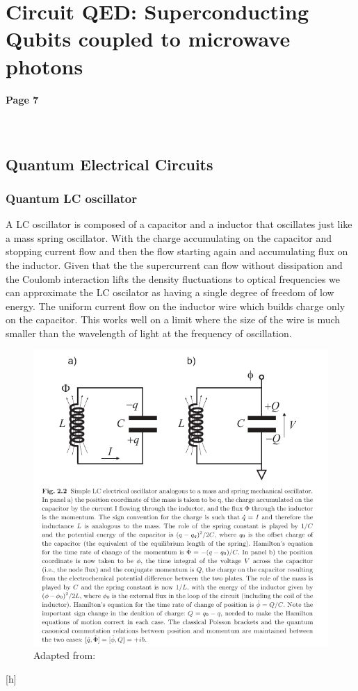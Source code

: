 \documentclass[12pt]{article}
\numberwithin{equation}{subsection}
\newcommand\page[1]{
{
\color{blue}\paragraph{
Page #1
}\mbox{}\\
}
}
\begin{document}
\section{Circuit QED: Superconducting Qubits coupled to microwave photons\cite{Girvin2015CircuitQS}}
\page{7}
\subsection{Quantum Electrical Circuits}
\subsubsection{Quantum LC oscillator}
A LC oscillator is composed of a capacitor and a inductor that oscillates just like a mass spring oscillator. With the charge accumulating on the capacitor and stopping current flow and then the flow starting again and accumulating flux on the inductor.
Given that the the supercurrent can flow without dissipation and the Coulomb interaction lifts the density fluctuations to optical frequencies we can approximate the LC oscilator as having a single degree of freedom of low energy. The uniform current flow on the inductor wire which builds charge only on the capacitor. This works well on a limit where the size of the wire is much smaller than the wavelength of light at the frequency of oscillation. 

\begin{figure}[h]
\includegraphics[scale=3]{images/9-lc-oscillator.png}
\caption{Adapted from: \cite{Girvin2015CircuitQS}}
\end{figure}[h]
\end{document}
